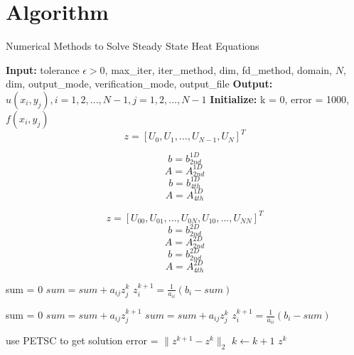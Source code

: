 \documentclass[a4paper]{article}
\begin{document}
\section{Algorithm}
\begin{algorithm}
\caption{Numerical Methods to Solve Steady State Heat Equations}
    \begin{algorithmic}
    \State \textbf{Input:} tolerance $\epsilon >0$, max\_iter, iter\_method, dim, fd\_method, domain, $N$, dim, output\_mode, verification\_mode, output\_file
    \State \textbf{Output:} $u(x_i,y_j), i = 1,2,...,N-1, j = 1,2,...,N-1$ 
    \State \textbf{Initialize:} k = 0, error = 1000, $f(x_i,y_j)$
            $$z=[U_0, U_1,...,U_{N-1},U_N]^T$$
            
            $$b = b_{2nd}^{1D}$$
            $$A = A_{2nd}^{1D}$$
            \Else
            $$b = b_{4th}^{1D}$$
            $$A = A_{4th}^{1D}$$
            \EndIf
        \EndIf
        
             $$z = [U_{00}, U_{01},...,U_{0N},U_{10},...,U_{NN}]^T$$
            $$b = b_{2nd}^{2D}$$
            $$A = A_{2nd}^{2D}$$
            \Else
            $$b = b_{2nd}^{2D}$$
            $$A = A_{4th}^{2D}$$
            \EndIf
        \EndIf
    
        
        
        sum = 0
        $sum = sum+a_{ij}z_j^k$
        \EndIf
        \EndFor
        $z_i^{k+1} = \frac{1}{a_{ii}}(b_i-sum)$
        \EndFor
        \EndIf
        
        
        sum = 0
        $sum = sum+a_{ij}z_j^{k+1}$
        \EndFor
        $sum = sum+a_{ij}z_j^k$
        \EndFor
        $z_i^{k+1} = \frac{1}{a_{ii}}(b_i-sum)$
        \EndFor
        \EndIf
         
            use PETSC to get solution
        \EndIf
        \State error = $\|z^{k+1}-z^k\|_2$
        \State $k \leftarrow k+1$
        \EndWhile
    \Return $z^k$
    \end{algorithmic}
\end{algorithm}
\end{document}
